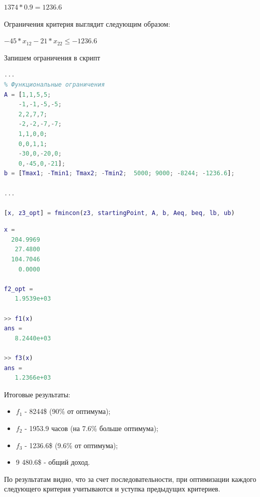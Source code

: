 \begin{center}
$1374 * 0.9 = 1236.6$
\end{center}
Ограничения критерия выглядит следующим образом:
\begin{center}
$-45*x_{12}-21*x_{22}\leq -1236.6$
\end{center}
Запишем ограничения в скрипт
\begin{lstlisting}[language={matlab}, caption={Последовательные уступки}]
...
% Функциональные ограничения
A = [1,1,5,5;
    -1,-1,-5,-5;
    2,2,7,7;
    -2,-2,-7,-7;
    1,1,0,0;
    0,0,1,1;
    -30,0,-20,0;
    0,-45,0,-21];
b = [Tmax1; -Tmin1; Tmax2; -Tmin2;  5000; 9000; -8244; -1236.6];

...

[x, z3_opt] = fmincon(z3, startingPoint, A, b, Aeq, beq, lb, ub)
\end{lstlisting}
\begin{lstlisting}[language={matlab}, caption={Результат выполнения}]
x =
  204.9969
   27.4800
  104.7046
    0.0000

f2_opt =
   1.9539e+03
  
>> f1(x)
ans =
   8.2440e+03
   
>> f3(x)
ans =
   1.2366e+03
\end{lstlisting}

Итоговые результаты:
\begin{itemize}
\item $f_1$ - 8244\$ (90\% от оптимума);
\item $f_2$ - 1953.9 часов (на 7.6\% больше оптимума);
\item $f_3$ - 1236.6\$ (9.6\% от оптимума);
\item 9 480.6\$ - общий доход.
\end{itemize}
По результатам видно, что за счет последовательности, при оптимизации каждого следующего критерия учитываются и уступка предыдущих критериев.

